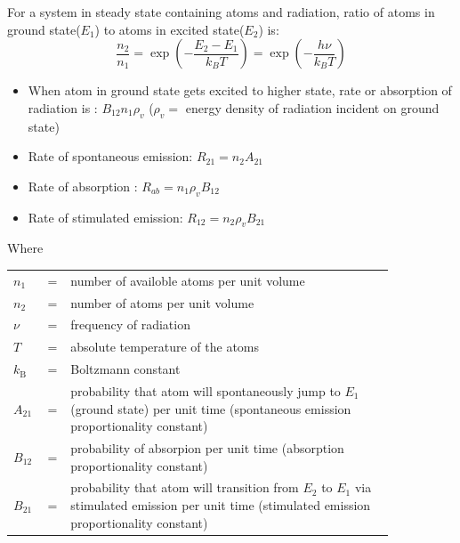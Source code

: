 \documentclass[12pt, a4paper]{article}
\begin{document}
\newcommand{\rvv}{\rho_{v}}
For a system in steady state containing atoms and radiation, ratio of atoms in ground state($E_1$) to atoms in excited state($E_2$) is:
$$
	\frac{n_2}{n_1}=\exp\left(-\frac{E_2-E_1}{k_B T}\right) = \exp\left(-\frac{h \nu}{k_B T}\right)
$$
\begin{itemize}
	\item When atom in ground state gets excited to higher state, rate or absorption of radiation is : $B_{12} n_1 \rvv$ ($\rvv=$ energy density of radiation incident on ground state)
	\item Rate of spontaneous emission: $R_{21}=n_2 A_{21}$
	\item Rate of absorption : $R_{ab}=n_1 \rvv B_{12}$
	\item Rate of stimulated emission: $R_{12}=n_2 \rvv B_{21}$
\end{itemize}
Where
\begin{table}[ht]
	\begin{tabular}{l c p{0.85\linewidth}}
		$n_1$            & = & number of availoble atoms per unit volume                                                                                                      \\
		$n_2$            & = & number of atoms per unit volume                                                                                                                \\
		$\nu$            & = & frequency of radiation                                                                                                                         \\
		$T$              & = & absolute temperature of the atoms                                                                                                              \\
		$k_{\mathrm{B}}$ & = & Boltzmann constant                                                                                                                             \\
		$A_{21}$         & = & probability that atom will spontaneously jump to $E_1$ (ground state) per unit time (spontaneous emission proportionality constant)            \\
		$B_{12}$         & = & probability of absorpion per unit time (absorption proportionality constant)                                                                   \\
		$B_{21}$         & = & probability that atom will transition from $E_2$ to $E_1$ via stimulated emission per unit time (stimulated emission proportionality constant) \\
	\end{tabular}
\end{table}
\end{document}
